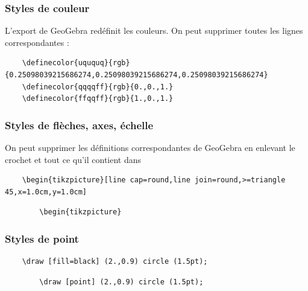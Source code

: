 \documentclass[10pt,a4paper]{report}
\begin{document}
\subsubsection{Styles de couleur}

L'export de GeoGebra redéfinit les couleurs. On peut supprimer toutes les lignes correspondantes :
\begin{verbatim}
	\definecolor{uququq}{rgb}{0.25098039215686274,0.25098039215686274,0.25098039215686274}
	\definecolor{qqqqff}{rgb}{0.,0.,1.}
	\definecolor{ffqqff}{rgb}{1.,0.,1.}
\end{verbatim}


\subsubsection{Styles de flèches, axes, échelle}

On peut supprimer les définitions correspondantes de GeoGebra en enlevant le crochet et tout ce qu'il contient dans
\begin{verbatim}
	\begin{tikzpicture}[line cap=round,line join=round,>=triangle 45,x=1.0cm,y=1.0cm]
\end{verbatim}

\hspace*{4cm}
{\huge\textrightarrow \quad}
\begin{minipage}{.4\linewidth}
	\begin{verbatim}
		\begin{tikzpicture}
	\end{verbatim}
\end{minipage}



\subsubsection{Styles de point}

\begin{verbatim}
	\draw [fill=black] (2.,0.9) circle (1.5pt);
\end{verbatim}

\hspace*{4cm}
{\huge\textrightarrow \quad}
\begin{minipage}{.4\linewidth}
	\begin{verbatim}
		\draw [point] (2.,0.9) circle (1.5pt);
	\end{verbatim}
\end{minipage}
\end{document}
